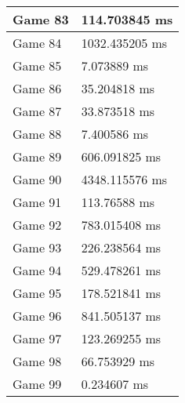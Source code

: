 \begin{tabular}{|l|l|}
	Game 83 & 114.703845 ms \\ \hline
	Game 84 & 1032.435205 ms \\ \hline
	Game 85 & 7.073889 ms \\ \hline
	Game 86 & 35.204818 ms \\ \hline
	Game 87 & 33.873518 ms \\ \hline
	Game 88 & 7.400586 ms \\ \hline
	Game 89 & 606.091825 ms \\ \hline
	Game 90 & 4348.115576 ms \\ \hline
	Game 91 & 113.76588 ms \\ \hline
	Game 92 & 783.015408 ms \\ \hline
	Game 93 & 226.238564 ms \\ \hline
	Game 94 & 529.478261 ms \\ \hline
	Game 95 & 178.521841 ms \\ \hline
	Game 96 & 841.505137 ms \\ \hline
	Game 97 & 123.269255 ms \\ \hline
	Game 98 & 66.753929 ms \\ \hline
	Game 99 & 0.234607 ms \\ \hline
\end{tabular}
